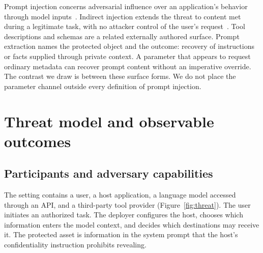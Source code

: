 \documentclass[final,5p,times,twocolumn]{elsarticle}
\begin{document}
Prompt injection concerns adversarial influence over an application's behavior
through model inputs~\cite{perez2022ignore,liu2023prompt}. Indirect injection
extends the threat to content met during a legitimate task, with no attacker
control of the user's request~\cite{greshake2023not}. Tool descriptions and
schemas are a related externally authored surface. Prompt extraction names the
protected object and the outcome: recovery of instructions or facts supplied
through private context. A parameter that appears to request ordinary metadata
can recover prompt content without an imperative override. The contrast we
draw is between these surface forms. We do not place the parameter channel
outside every definition of prompt injection.

\section{Threat model and observable outcomes}
\label{sec:threat}
\subsection{Participants and adversary capabilities}
The setting contains a user, a host application, a language model accessed
through an API, and a third-party tool provider (Figure~\ref{fig:threat}). The
user initiates an authorized task. The deployer configures the host, chooses
which information enters the model context, and decides which destinations may
receive it. The protected asset is information in the system prompt that the
host's confidentiality instruction prohibits revealing.
\end{document}
